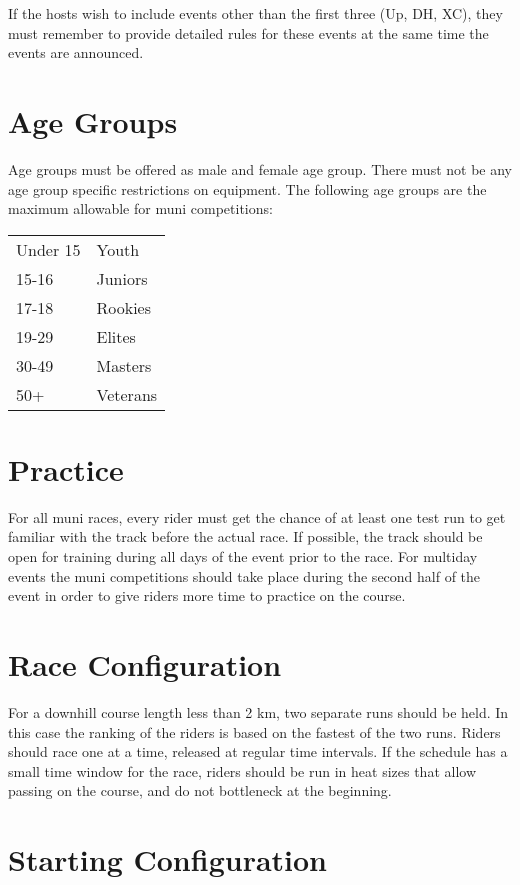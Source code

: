 If the hosts wish to include events other than the first three (Up, DH, XC), they must remember to provide detailed rules for these events at the same time the events are announced.

\section{Age Groups}
Age groups must be offered as male and female age group.
There must not be any age group specific restrictions on equipment.
The following age groups are the maximum allowable for muni competitions:

\begin{tabular}{ l l}
Under 15 & Youth \\
15-16 & Juniors \\
17-18 & Rookies \\
19-29 & Elites \\
30-49 & Masters \\
50+ & Veterans \\
\end{tabular}

\section{Practice}

For all muni races, every rider must get the chance of at least one test run to get familiar with the track before the actual race.
If possible, the track should be open for training during all days of the event prior to the race.
For multiday events the muni competitions should take place during the second half of the event in order to give riders more time to practice on the course.

\section{Race Configuration}

For a downhill course length less than 2 km, two separate runs should be held.
In this case the ranking of the riders is based on the fastest of the two runs.
Riders should race one at a time, released at regular time intervals.
If the schedule has a small time window for the race, riders should be run in heat sizes that allow passing on the course, and do not bottleneck at the beginning.

\section{Starting Configuration}

